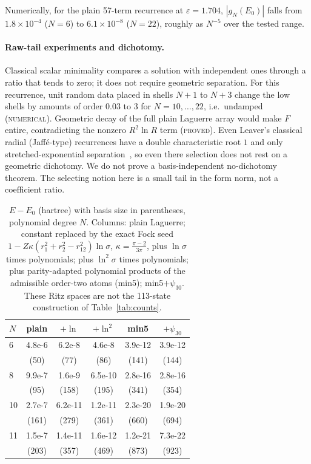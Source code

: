 \documentclass[aps,pra,twocolumn,superscriptaddress,nofootinbib]{revtex4-2}
\theoremstyle{remark}
\newcommand{\lab}[1]{\textup{\textsc{#1}}}
\begin{document}
Numerically, for the plain 57-term recurrence at $\varepsilon=1.704$, $|g_N(E_0)|$ falls from $1.8\times10^{-4}$ ($N=6$) to $6.1\times10^{-8}$ ($N=22$), roughly as $N^{-5}$ over the tested range.

\paragraph*{Raw-tail experiments and dichotomy.}
Classical scalar minimality compares a solution with independent ones through a ratio that tends to zero; it does not require geometric separation.
For this recurrence, unit random data placed in shells $N+1$ to $N+3$ change the low shells by amounts of order $0.03$ to $3$ for $N=10,\dots,22$, i.e.\ undamped (\lab{numerical}).
Geometric decay of the full plain Laguerre array would make $F$ entire, contradicting the nonzero $R^2\ln R$ term (\lab{proved}).
Even Leaver's classical radial (Jaff\'e-type) recurrences have a double characteristic root $1$ and only stretched-exponential separation~\cite{Leaver1985,Leaver1986}, so even there selection does not rest on a geometric dichotomy.
We do not prove a basis-independent no-dichotomy theorem.
The selecting notion here is a small tail in the form norm, not a coefficient ratio.

\begin{table}[t]
\caption{$E-E_0$ (hartree) with basis size in parentheses, polynomial degree $N$.
Columns: plain Laguerre; constant replaced by the exact Fock seed $1-Z\kappa(r_1^2+r_2^2-r_{12}^2)\ln\sigma$, $\kappa=\frac{\pi-2}{3\pi}$, plus $\ln\sigma$ times polynomials; plus $\ln^2\sigma$ times polynomials; plus parity-adapted polynomial products of the admissible order-two atoms (min5); min5$+\psi_{30}$.
These Ritz spaces are not the 113-state construction of Table~\ref{tab:counts}.}
\label{tab:energy}
\begin{ruledtabular}
\begin{tabular}{lccccc}
$N$ & plain & $+\ln$ & $+\ln^2$ & min5 & $+\psi_{30}$\\
\hline
6 & 4.8e-6 & 6.2e-8 & 4.6e-8 & 3.9e-12 & 3.9e-12\\
 & (50) & (77) & (86) & (141) & (144)\\
8 & 9.9e-7 & 1.6e-9 & 6.5e-10 & 2.8e-16 & 2.8e-16\\
 & (95) & (158) & (195) & (341) & (354)\\
10 & 2.7e-7 & 6.2e-11 & 1.2e-11 & 2.3e-20 & 1.9e-20\\
 & (161) & (279) & (361) & (660) & (694)\\
11 & 1.5e-7 & 1.4e-11 & 1.6e-12 & 1.2e-21 & 7.3e-22\\
 & (203) & (357) & (469) & (873) & (923)
\end{tabular}
\end{ruledtabular}
\end{table}
\end{document}
